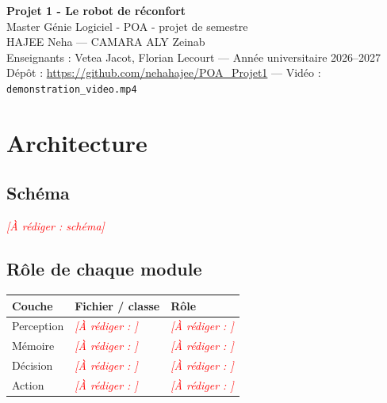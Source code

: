 \documentclass[11pt,a4paper]{article}
\newcommand{\afaire}[1]{\textcolor{red}{\textit{[À rédiger : #1]}}}
\begin{document}
\begin{center}
  {\Large\bfseries Projet 1 - Le robot de réconfort}\\[0.3cm]
  Master Génie Logiciel - POA - projet de semestre\\[0.2cm]
  HAJEE Neha \quad --- \quad CAMARA ALY Zeinab\\[0.2cm]
  Enseignants : Vetea Jacot, Florian Lecourt --- Année universitaire 2026--2027\\[0.2cm]
  Dépôt : \url{https://github.com/nehahajee/POA_Projet1} --- Vidéo : \texttt{demonstration_video.mp4}
\end{center}


\section{Architecture}

\subsection{Schéma}
\afaire{schéma}

\subsection{Rôle de chaque module}
\begin{tabular}{@{}lll@{}}
  \toprule
  Couche & Fichier / classe & Rôle \\
  \midrule
  Perception & \afaire{} & \afaire{} \\
  Mémoire    & \afaire{} & \afaire{} \\
  Décision   & \afaire{} & \afaire{} \\
  Action     & \afaire{} & \afaire{} \\
  \bottomrule
\end{tabular}
\end{document}
